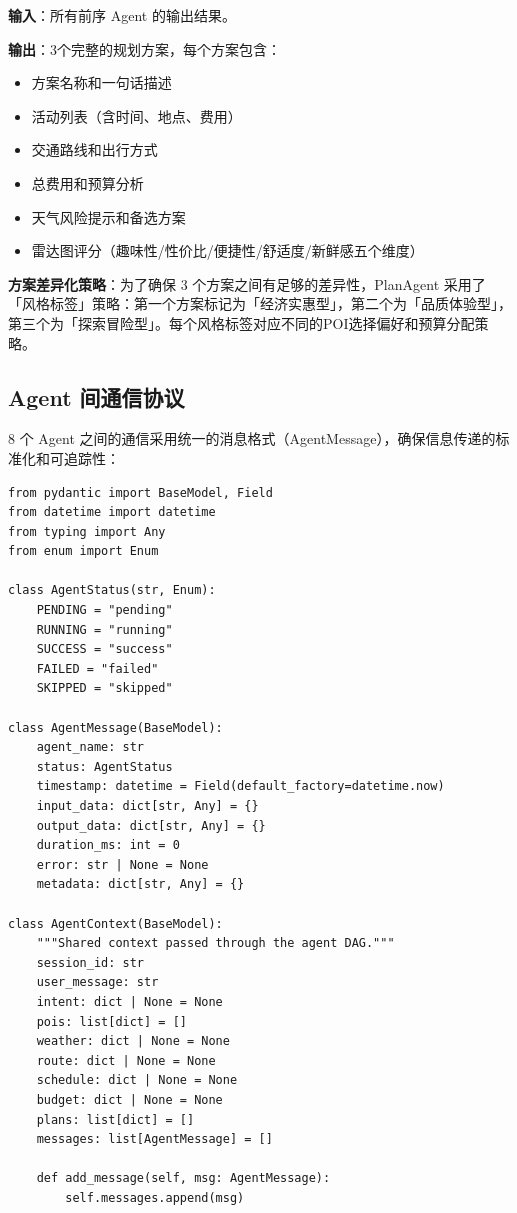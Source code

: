 \documentclass[12pt,a4paper]{ctexart}
\begin{document}
\textbf{输入}：所有前序 Agent 的输出结果。

\textbf{输出}：3个完整的规划方案，每个方案包含：
\begin{itemize}[leftmargin=2em]
  \item 方案名称和一句话描述
  \item 活动列表（含时间、地点、费用）
  \item 交通路线和出行方式
  \item 总费用和预算分析
  \item 天气风险提示和备选方案
  \item 雷达图评分（趣味性/性价比/便捷性/舒适度/新鲜感五个维度）
\end{itemize}

\textbf{方案差异化策略}：为了确保 3 个方案之间有足够的差异性，PlanAgent 采用了「风格标签」策略：第一个方案标记为「经济实惠型」，第二个为「品质体验型」，第三个为「探索冒险型」。每个风格标签对应不同的POI选择偏好和预算分配策略。

\subsection{Agent 间通信协议}

8 个 Agent 之间的通信采用统一的消息格式（AgentMessage），确保信息传递的标准化和可追踪性：

\begin{lstlisting}[caption={AgentMessage 协议定义},label={lst:agent-msg}]
from pydantic import BaseModel, Field
from datetime import datetime
from typing import Any
from enum import Enum

class AgentStatus(str, Enum):
    PENDING = "pending"
    RUNNING = "running"
    SUCCESS = "success"
    FAILED = "failed"
    SKIPPED = "skipped"

class AgentMessage(BaseModel):
    agent_name: str
    status: AgentStatus
    timestamp: datetime = Field(default_factory=datetime.now)
    input_data: dict[str, Any] = {}
    output_data: dict[str, Any] = {}
    duration_ms: int = 0
    error: str | None = None
    metadata: dict[str, Any] = {}

class AgentContext(BaseModel):
    """Shared context passed through the agent DAG."""
    session_id: str
    user_message: str
    intent: dict | None = None
    pois: list[dict] = []
    weather: dict | None = None
    route: dict | None = None
    schedule: dict | None = None
    budget: dict | None = None
    plans: list[dict] = []
    messages: list[AgentMessage] = []

    def add_message(self, msg: AgentMessage):
        self.messages.append(msg)
\end{lstlisting}
\end{document}
